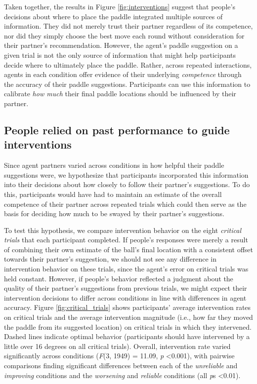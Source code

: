 \documentclass[10pt,letterpaper]{article}
\begin{document}
Taken together, the results in Figure \ref{fig:interventions} suggest that people's decisions about where to place the paddle integrated multiple sources of information. They did not merely trust their partner regardless of its competence, nor did they simply choose the best move each round without consideration for their partner's recommendation. However, the agent's paddle suggestion on a given trial is not the only source of information that might help participants decide where to ultimately place the paddle. Rather, across repeated interactions, agents in each condition offer evidence of their underlying \textit{competence} through the accuracy of their paddle suggestions. Participants can use this information to calibrate \textit{how much} their final paddle locations should be influenced by their partner. 


\subsection{People relied on past performance to guide interventions}

Since agent partners varied across conditions in how helpful their paddle suggestions were, we hypothesize that participants incorporated this information into their decisions about how closely to follow their partner's suggestions. To do this, participants would have had to maintain an estimate of the overall competence of their partner across repeated trials which could then serve as the basis for deciding how much to be swayed by their partner's suggestions. 

To test this hypothesis, we compare intervention behavior on the eight \textit{critical trials} that each participant completed. If people's responses were merely a result of combining their own estimate of the ball's final location with a consistent offset towards their partner's suggestion, we should not see any difference in intervention behavior on these trials, since the agent's error on critical trials was held constant. However, if people's behavior reflected a judgment about the quality of their partner's suggestions from previous trials, we might expect their intervention decisions to differ across conditions in line with differences in agent accuracy. Figure \ref{fig:critical_trials} shows participants' average intervention rates on critical trials and the average intervention magnitude (i.e., how far they moved the paddle from its suggested location) on critical trials in which they intervened. Dashed lines indicate optimal behavior (participants should have intervened by a little over 16 degrees on all critical trials). Overall, intervention rate varied significantly across conditions (\textit{F}(3, 1949) = 11.09, \textit{p} \textless{0.001}), with pairwise comparisons finding significant differences between each of the \textit{unreliable} and \textit{improving} conditions and the \textit{worsening} and \textit{reliable} conditions (all \textit{p}s \textless{0.01}). 
\end{document}

